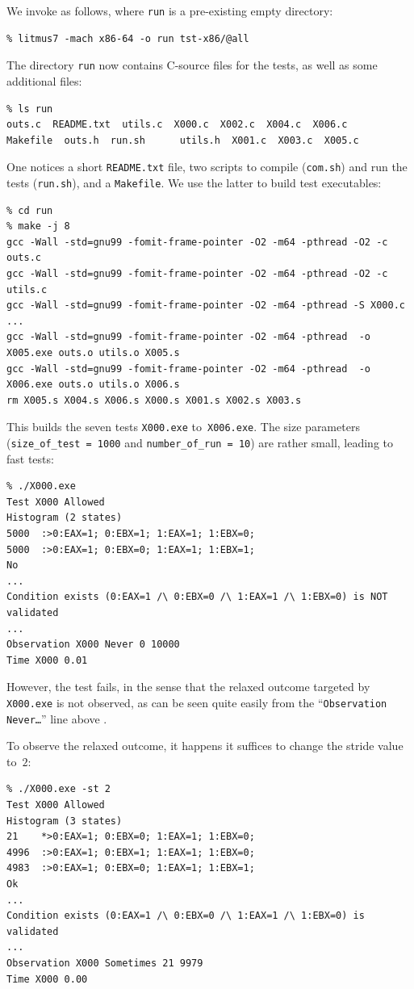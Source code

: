 We invoke \litmus{} as follows,
where \texttt{run} is a pre-existing empty directory:
\begin{verbatim}
% litmus7 -mach x86-64 -o run tst-x86/@all
\end{verbatim}
The directory \texttt{run} now contains C-source files for the tests,
as well as some additional files:
\begin{verbatim}
% ls run
outs.c  README.txt  utils.c  X000.c  X002.c  X004.c  X006.c
Makefile  outs.h  run.sh      utils.h  X001.c  X003.c  X005.c
\end{verbatim}
One notices a short \texttt{README.txt} file, two scripts to compile
(\texttt{com.sh}) and run the tests (\texttt{run.sh}), and a \texttt{Makefile}.
We use the latter to build test executables:
\begin{verbatim}
% cd run
% make -j 8
gcc -Wall -std=gnu99 -fomit-frame-pointer -O2 -m64 -pthread -O2 -c outs.c
gcc -Wall -std=gnu99 -fomit-frame-pointer -O2 -m64 -pthread -O2 -c utils.c
gcc -Wall -std=gnu99 -fomit-frame-pointer -O2 -m64 -pthread -S X000.c
...
gcc -Wall -std=gnu99 -fomit-frame-pointer -O2 -m64 -pthread  -o X005.exe outs.o utils.o X005.s
gcc -Wall -std=gnu99 -fomit-frame-pointer -O2 -m64 -pthread  -o X006.exe outs.o utils.o X006.s
rm X005.s X004.s X006.s X000.s X001.s X002.s X003.s
\end{verbatim}
This builds the seven tests \texttt{X000.exe} to~\texttt{X006.exe}.
The size parameters (\verb+size_of_test = 1000+ and
\verb+number_of_run = 10+) are rather small, leading to fast tests:
\begin{verbatim}
% ./X000.exe
Test X000 Allowed
Histogram (2 states)
5000  :>0:EAX=1; 0:EBX=1; 1:EAX=1; 1:EBX=0;
5000  :>0:EAX=1; 0:EBX=0; 1:EAX=1; 1:EBX=1;
No
...
Condition exists (0:EAX=1 /\ 0:EBX=0 /\ 1:EAX=1 /\ 1:EBX=0) is NOT validated
...
Observation X000 Never 0 10000
Time X000 0.01
\end{verbatim}
However, the test fails, in the sense that the relaxed outcome targeted by
\texttt{X000.exe} is not observed, as can be seen quite easily from
the ``\texttt{Observation Never\ldots}'' line above .


To observe the relaxed outcome,
it happens it suffices to change the stride value to~$2$:
\begin{verbatim}
% ./X000.exe -st 2
Test X000 Allowed
Histogram (3 states)
21    *>0:EAX=1; 0:EBX=0; 1:EAX=1; 1:EBX=0;
4996  :>0:EAX=1; 0:EBX=1; 1:EAX=1; 1:EBX=0;
4983  :>0:EAX=1; 0:EBX=0; 1:EAX=1; 1:EBX=1;
Ok
...
Condition exists (0:EAX=1 /\ 0:EBX=0 /\ 1:EAX=1 /\ 1:EBX=0) is validated
...
Observation X000 Sometimes 21 9979
Time X000 0.00
\end{verbatim}

